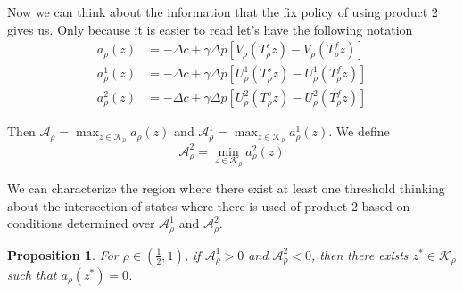 \documentclass[11pt]{article}
\newtheorem{proposition}{Proposition}
\begin{document}
Now we can think about the information that the fix policy of using product 2 gives us. Only because it is easier to read let's have the following notation
\begin{align}
    a_\rho(z) &= -\Delta c + \gamma \Delta p \left[V_\rho(T_\rho^s z)-V_\rho(T_\rho^f z)\right] \\
    a^1_\rho(z) &= -\Delta c + \gamma \Delta p\left[U_\rho^1(T_\rho^s z)-U_\rho^1(T_\rho^f z)\right] \\
    a^2_\rho(z) &= -\Delta c + \gamma \Delta p\left[U_\rho^2(T_\rho^s z)-U_\rho^2(T_\rho^f z)\right]
\end{align}

Then $\mathcal A_\rho = \max_{z\in\mathcal K_\rho} a_\rho(z)$ and $\mathcal A_\rho^1 = \max_{z\in\mathcal K_\rho} a^1 _\rho(z)$. We define 
\begin{equation}
    \mathcal A_\rho^2 = \min_{z\in\mathcal K_\rho} a^2_\rho(z)
\end{equation}

We can characterize the region where there exist at least one threshold thinking about the intersection of states where there is used of product 2 based on conditions determined over $\mathcal A_\rho^1$ and $\mathcal A_\rho^2$. 

\begin{proposition}
\label{prop:interior-indifference}
For $\rho\in(\frac12,1)$, if $\mathcal A_\rho^1>0$ and
$\mathcal A_\rho^2<0$, then there exists $z^*\in\mathcal K_\rho$
such that $a_\rho(z^*)=0$.
\end{proposition}
\end{document}

